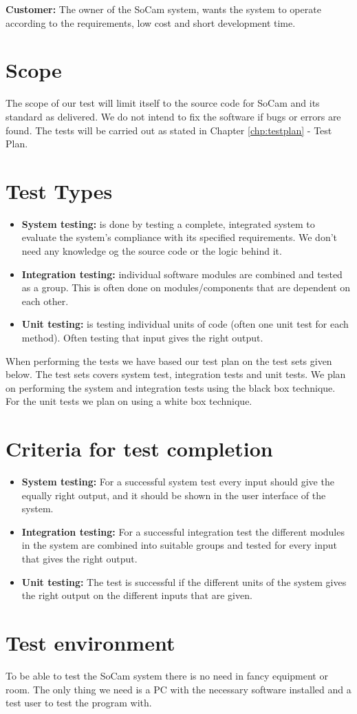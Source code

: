 		{\bf Customer:} The owner of the SoCam system, wants the system to operate according to the requirements, low cost and short development time.


	\section{Scope}
	The scope of our test will limit itself to the source code for SoCam and its standard as delivered. We do not intend to fix the software if bugs or errors are found. The tests will be carried out as stated in Chapter \ref{chp:testplan} - Test Plan.


	\section {Test Types}

		\begin{itemize}
			\item {\bf System testing:} is done by testing a complete, integrated system to 
			evaluate the system's compliance with its specified requirements. We don’t need 
			any knowledge og the source code or the logic behind it.
			\item {\bf Integration testing:} individual software modules are combined and tested as a group. 
			This is often done on modules/components that are dependent on each other. 
			\item {\bf Unit testing:} is testing individual units of code (often one unit test for each method). 
			Often testing that input gives the right output. 
		\end{itemize}

	When performing the tests we have based our test plan on the test sets given below. The test sets covers system test, integration tests and unit tests. We plan on performing the system and integration tests using the black box technique. For the unit tests we plan on using a white box technique. 

	\section{Criteria for test completion}

		\begin{itemize}
			\item {\bf System testing:} For a successful system test every input should give the equally right 
			output, and it should be shown in the user interface of the system. 
			\item {\bf Integration testing:} For a successful integration test the different modules in the 
			system are combined into suitable groups and tested for every input that gives the right output.  
			\item {\bf Unit testing:} The test is successful if the different units of the system gives the 
			right output on the different inputs that are given. 
		\end{itemize}

	\section {Test environment}

	To be able to test the SoCam system there is no need in fancy equipment or room. The only thing we need 
	is a PC with the necessary software installed and a test user to test the program with.



	
